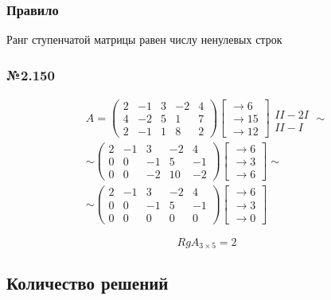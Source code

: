 \documentclass{article}
\begin{document}
\subsubsection{Правило}

Ранг ступенчатой матрицы равен числу ненулевых строк

\subsubsection*{№2.150}

\begin{gather*}
	A = \begin{pmatrix}
		2 & -1 & 3 & -2 & 4 \\
		4 & -2 & 5 & 1 & 7 \\
		2 & -1 & 1 & 8 & 2
	\end{pmatrix}
	\begin{bmatrix}
		\to 6 \\
		\to 15 \\
		\to 12
	\end{bmatrix}
	\begin{matrix}
		\\ II - 2I \\ II - I
	\end{matrix} \sim \\
	\sim \begin{pmatrix}
		2 & -1 & 3 & -2 & 4 \\
		0 & 0 & -1 & 5 & -1 \\
		0 & 0 & -2 & 10 & -2
	\end{pmatrix}
	\begin{bmatrix}
		\to 6 \\
		\to 3 \\
		\to 6
	\end{bmatrix} \sim \\
	\sim \begin{pmatrix}
		2 & -1 & 3 & -2 & 4 \\
		0 & 0 & -1 & 5 & -1 \\
		0 & 0 & 0 & 0 & 0
	\end{pmatrix}
	\begin{bmatrix}
		\to 6 \\
		\to 3 \\
		\to 0
	\end{bmatrix}
\end{gather*}

\[
Rg A_{3 \times 5} = 2
\]

\subsection{Количество решений}
\end{document}

